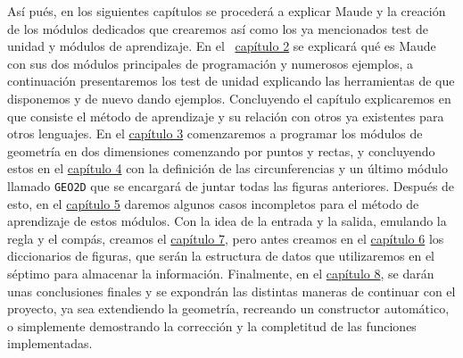 Así pués, en los siguientes capítulos se procederá a explicar Maude y la creación de los módulos dedicados que crearemos así como los ya mencionados test de unidad y módulos de aprendizaje. En el ~\hyperref[cap.2]{capítulo 2} se explicará qué es Maude con sus dos módulos principales de programación y numerosos ejemplos, a continuación presentaremos los test de unidad explicando las herramientas de que disponemos y de nuevo dando ejemplos. Concluyendo el capítulo explicaremos en que consiste el método de aprendizaje y su relación con otros ya existentes para otros lenguajes. En el \hyperref[cap.3]{capítulo 3} comenzaremos a programar los módulos de geometría en dos dimensiones comenzando por puntos y rectas, y concluyendo estos en el \hyperref[cap.4]{capítulo 4} con la definición de las circunferencias y un último módulo llamado \texttt{GEO2D} que se encargará de juntar todas las figuras anteriores. Después de esto, en el \hyperref[cap.5]{capítulo 5} daremos algunos casos incompletos para el método de aprendizaje de estos módulos. Con la idea de la entrada y la salida, emulando la regla y el compás, creamos el \hyperref[cap.7]{capítulo 7}, pero antes creamos en el \hyperref[cap.6]{capítulo 6} los diccionarios de figuras, que serán la estructura de datos que utilizaremos en el séptimo para almacenar la información. Finalmente, en el \hyperref[cap.8]{capítulo 8}, se darán unas conclusiones finales y se expondrán las distintas maneras de continuar con el proyecto, ya sea extendiendo la geometría, recreando un constructor automático, o simplemente demostrando la corrección y la completitud de las funciones implementadas.
